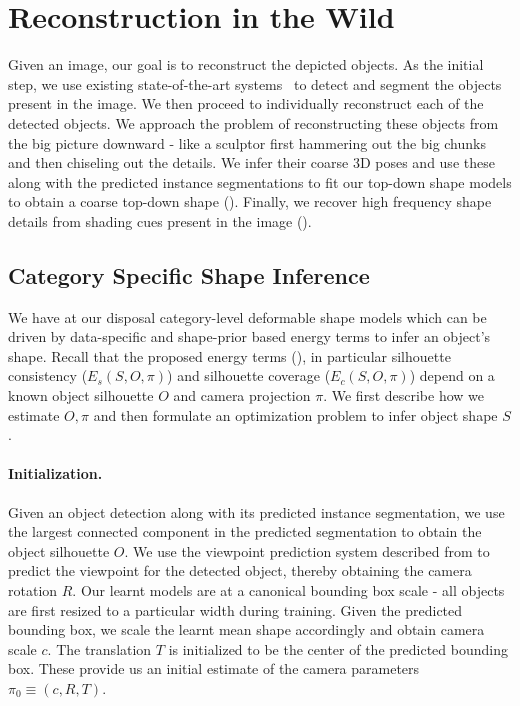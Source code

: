 \section{Reconstruction in the Wild}
Given an image, our goal is to reconstruct the depicted objects. As the initial step, we use existing state-of-the-art systems~\cite{BharathECCV2014} to detect and segment the objects present in the image. We then proceed to individually reconstruct each of the detected objects. We approach the problem of reconstructing these objects from the big picture downward - like a sculptor first hammering out the big chunks and then chiseling out the details. We infer their coarse 3D poses and use these along with the predicted instance segmentations to fit our top-down shape models to obtain a coarse top-down shape (). Finally, we recover high frequency shape details from shading cues present in the image ().

\subsection{Category Specific Shape Inference}

We have at our disposal category-level deformable shape models which can be driven by data-specific and shape-prior based energy terms to infer an object's shape.  Recall that the proposed energy terms (), in particular silhouette consistency ($E_{s}(S,O,\pi)$) and silhouette coverage ($E_{c}(S,O,\pi)$) depend on a known object silhouette $O$ and camera projection $\pi$. We first describe how we estimate $O,\pi$ and then formulate an optimization  problem to infer object shape $S$.


\paragraph{Initialization.} Given an object detection along with its predicted instance segmentation, we use the largest connected component in the predicted segmentation to obtain the object silhouette $O$. We use the viewpoint prediction system described from \cite{ShubhamPose} to predict the viewpoint for the detected object, thereby obtaining the camera rotation $R$. Our learnt models are at a canonical bounding box scale - all objects are first resized to a particular width during training. Given the predicted bounding box, we scale the learnt mean shape accordingly and obtain camera scale $c$. The translation $T$ is initialized to be the center of the predicted bounding box. These provide us an initial estimate of the camera parameters $\pi_0 \equiv (c,R,T)$.


